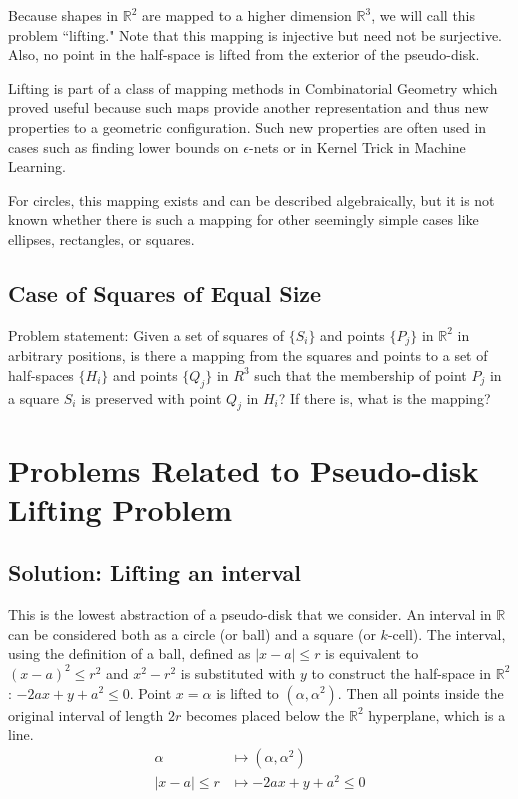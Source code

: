 \documentclass{NSF}
\begin{document}
Because shapes in $\mathbb{R}^2$ are mapped to a higher dimension $\mathbb{R}^3$, we will call this problem ``lifting." Note that this mapping is injective but need not be surjective. Also, no point in the half-space is lifted from the exterior of the pseudo-disk.

Lifting is part of a class of mapping methods in Combinatorial Geometry which proved useful because such maps provide another representation and thus new properties to a geometric configuration. Such new properties are often used in cases such as finding lower bounds on $\epsilon$-nets or in Kernel Trick in Machine Learning. 

For circles, this mapping exists and can be described algebraically, but it is not known whether there is such a mapping for other seemingly simple cases like ellipses, rectangles, or squares. 

\subsection{Case of Squares of Equal Size}
Problem statement: Given a set of squares of  $\{S_i\}$ and points $\{P_j\}$ in $\mathbb{R}^2$ in arbitrary positions, is there a mapping from the squares and points to a set of half-spaces $\{H_i\}$ and points $\{Q_j\}$ in $R^3$ such that the membership of point $P_j$ in a square $S_i$ is preserved with point $Q_j$ in $H_i$? If there is, what is the mapping? 

\section{Problems Related to Pseudo-disk Lifting Problem}
\subsection{Solution: Lifting an interval}
This is the lowest abstraction of a pseudo-disk that we consider. An interval in $\mathbb{R}$ can be considered both as a circle (or ball) and a square (or $k$-cell). The interval, using the definition of a ball, defined as $|x-a|\leq r$ is equivalent to $(x-a)^2 \leq r^2$ and $x^2-r^2$ is substituted with $y$ to construct the half-space in $\mathbb{R}^2$: $-2ax+y+a^2 \leq 0$.  Point $x=\alpha$ is lifted to $(\alpha, \alpha^2)$. Then all points inside the original interval of length $2r$ becomes placed below the $\mathbb{R}^2$ hyperplane, which is a line.
\begin{align*}
\alpha & \mapsto (\alpha,\alpha^2) \\
|x-a|\leq r & \mapsto -2ax + y + a^2 \leq 0
\end{align*}
\end{document}
